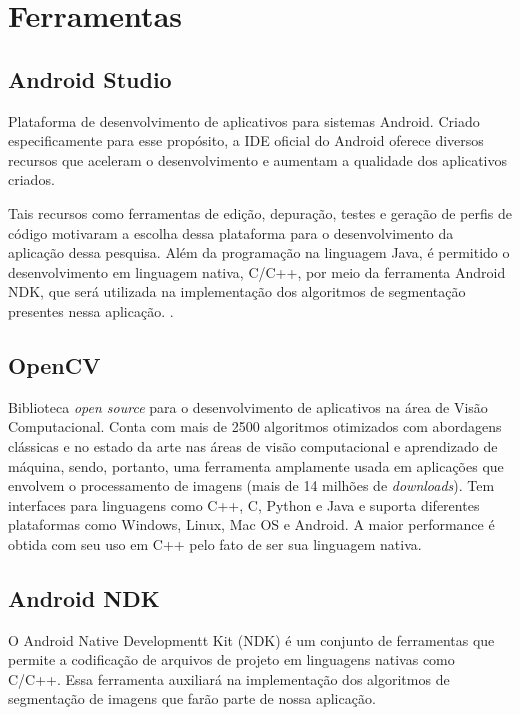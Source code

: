 \chapter{Ferramentas}\label{cap:ferramentas}

\section{Android Studio}
Plataforma de desenvolvimento de aplicativos para sistemas Android. Criado especificamente para esse propósito, a IDE oficial do Android oferece diversos recursos que aceleram o desenvolvimento e aumentam a qualidade dos aplicativos criados.

Tais recursos como ferramentas de edição, depuração, testes e geração de perfis de código motivaram a escolha dessa plataforma para o desenvolvimento da aplicação dessa pesquisa. Além da programação na linguagem Java, é permitido o desenvolvimento em linguagem nativa, C/C++, por meio da ferramenta Android NDK, que será utilizada na implementação dos algoritmos de segmentação presentes nessa aplicação. \citep{androidstudio}.

\section{OpenCV}\label{sec:opencv}
Biblioteca \textit{open source} para o desenvolvimento de aplicativos na área de Visão Computacional. Conta com mais de 2500 algoritmos otimizados com abordagens clássicas e no estado da arte nas áreas de visão computacional e aprendizado de máquina, sendo, portanto, uma ferramenta amplamente usada em aplicações que envolvem o processamento de imagens (mais de 14 milhões de \textit{downloads}). Tem interfaces para linguagens como C++, C, Python e Java e suporta diferentes plataformas como Windows, Linux, Mac OS e Android. A maior performance é obtida com seu uso em C++ pelo fato de ser sua linguagem nativa. \citep{opencv}

\section{Android NDK}
O Android Native Developmentt Kit (NDK) é um conjunto de ferramentas que permite a codificação de arquivos de projeto em linguagens nativas como C/C++. Essa ferramenta auxiliará na implementação dos algoritmos de segmentação de imagens que farão parte de nossa aplicação. \citep{ndk}